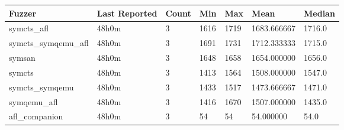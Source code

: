 
\begin{table*}[h]
\centering
\begin{tabular}{|l|l|l|l|l|l|l|}
\hline
\textbf{Fuzzer} & \textbf{Last Reported} & \textbf{Count} & \textbf{Min} & \textbf{Max} & \textbf{Mean} & \textbf{Median} \\
\hline
symcts\_afl        & 48h0m              & 3      & 1616  & 1719  & 1683.666667   & 1716.0     \\
symcts\_symqemu\_afl & 48h0m              & 3      & 1691  & 1731  & 1712.333333   & 1715.0     \\
symsan             & 48h0m              & 3      & 1648  & 1658  & 1654.000000   & 1656.0     \\
symcts             & 48h0m              & 3      & 1413  & 1564  & 1508.000000   & 1547.0     \\
symcts\_symqemu    & 48h0m              & 3      & 1433  & 1517  & 1473.666667   & 1471.0     \\
symqemu\_afl       & 48h0m              & 3      & 1416  & 1670  & 1507.000000   & 1435.0     \\
afl\_companion     & 48h0m              & 3      & 54    & 54    & 54.000000     & 54.0       \\
\hline
\end{tabular}
\end{table*}